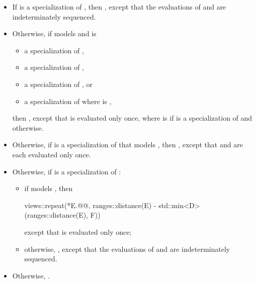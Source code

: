\begin{itemize}
\item
If  is a specialization of
,
then ,
except that the evaluations of  and 
are indeterminately sequenced.

\item
Otherwise, if  models
and is
\begin{itemize}
\item a specialization of ,
\item a specialization of ,
\item a specialization of , or
\item a specialization of 
where  is ,
\end{itemize}
then ,
except that  is evaluated only once,
where  is 
if  is a specialization of  and  otherwise.

\item
Otherwise,
if  is
a specialization of 
that models ,
then
,
except that  and  are each evaluated only once.

\item
Otherwise, if  is
a specialization of :
\begin{itemize}
\item
if  models ,
then
\begin{codeblock}
views::repeat(*E.@@, ranges::distance(E) - std::min<D>(ranges::distance(E), F))
\end{codeblock}
except that  is evaluated only once;
\item
otherwise, ,
except that the evaluations of  and  are indeterminately sequenced.
\end{itemize}

\item
Otherwise, .
\end{itemize}

